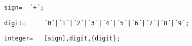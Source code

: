 \documentclass{article}
\begin{document}
    \begin{lstlisting}[mathescape=true]
     sign= 	´+´;
    \end{lstlisting}
    
    \begin{lstlisting}[mathescape=true]
     digit= 	´0´|´1´|´2´|´3´|´4´|´5´|´6´|´7´|´8´|´9´;
    \end{lstlisting}
    
    \begin{lstlisting}[mathescape=true]
     integer= 	[sign],digit,{digit};
    \end{lstlisting}
    
\end{document}
